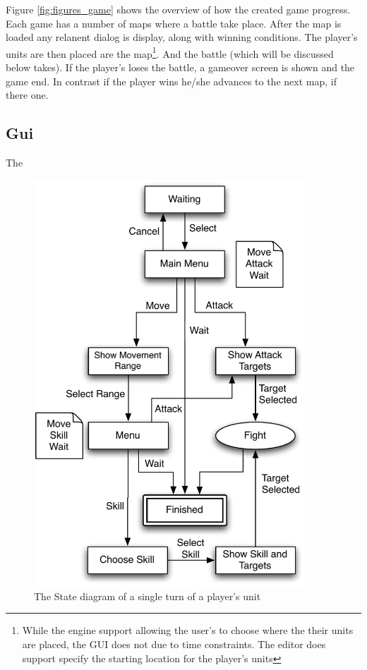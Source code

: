 Figure \ref{fig:figures_game} shows the overview of how the created game progress.  Each game has a number of maps where a battle take place. After the map is loaded any relanent dialog is display, along with winning conditions. The player's units are then placed are the map\footnote{While the engine support allowing the user's to choose where the their units are placed, the GUI does not due to time constraints. The editor does support specify the starting location for the player's units}.  And the battle (which will be discussed below takes). If the player's loses the battle, a gameover screen is shown and the game end. In contrast if the player wins he/she advances to the next map, if there one.    

\subsection{Gui}

The 

\begin{figure}[hb]
	\centering
		\includegraphics[width=4in]{figures/unit.pdf}
	\caption{The State diagram of a single turn of a player's unit}
	\label{fig:figures_unit}
\end{figure}

